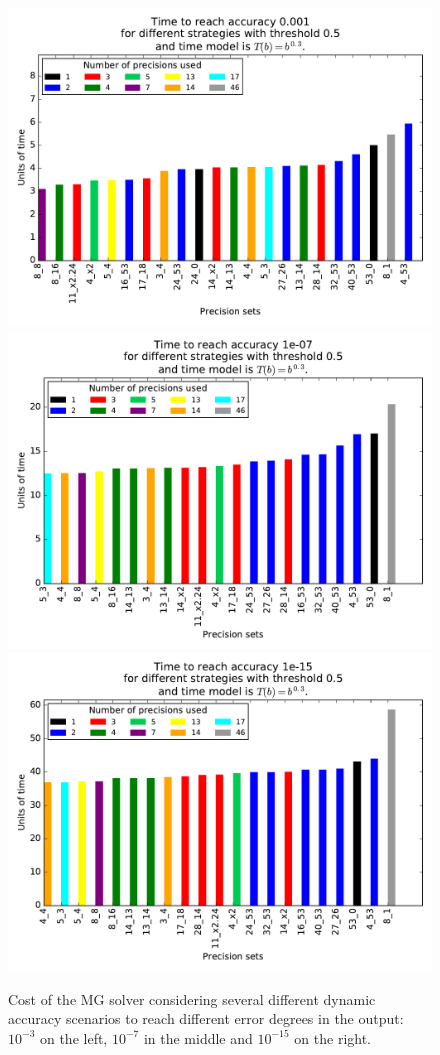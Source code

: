    \begin{figure}
    \includegraphics[width=0.33\linewidth]{figs/cost_3.pdf}
    \includegraphics[width=0.33\linewidth]{figs/cost_7.pdf}
    \includegraphics[width=0.33\linewidth]{figs/cost_15.pdf}
    \caption{Cost of the MG solver considering several different dynamic accuracy scenarios to reach different error degrees in the output: $10^{-3}$ on the left, $10^{-7}$ in the middle and $10^{-15}$ on the right.}
    \label{fig.estimation1}
   \end{figure}
   
